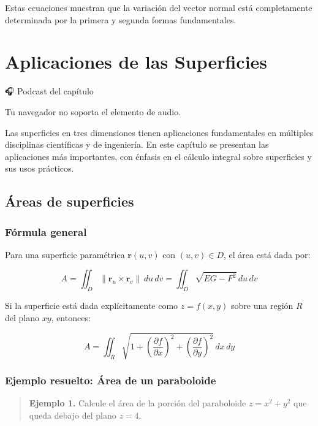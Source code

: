 \documentclass[
]{book}
\begin{document}
Estas ecuaciones muestran que la variación del vector normal está completamente determinada por la primera y segunda formas fundamentales.

\chapter{Aplicaciones de las Superficies}\label{aplicaciones}

🎧 Podcast del capítulo

Tu navegador no soporta el elemento de audio.

Las superficies en tres dimensiones tienen aplicaciones fundamentales en múltiples disciplinas científicas y de ingeniería. En este capítulo se presentan las aplicaciones más importantes, con énfasis en el cálculo integral sobre superficies y sus usos prácticos.

\section{Áreas de superficies}\label{uxe1reas-de-superficies}

\subsection{Fórmula general}\label{fuxf3rmula-general}

Para una superficie paramétrica \(\mathbf{r}(u, v)\) con \((u, v) \in D\), el área está dada por:

\[
A = \iint_D \|\mathbf{r}_u \times \mathbf{r}_v\| \, du\, dv = \iint_D \sqrt{EG - F^2} \, du\, dv
\]

Si la superficie está dada explícitamente como \(z = f(x, y)\) sobre una región \(R\) del plano \(xy\), entonces:

\[
A = \iint_R \sqrt{1 + \left(\frac{\partial f}{\partial x}\right)^2 + \left(\frac{\partial f}{\partial y}\right)^2} \, dx\, dy
\]

\subsection{Ejemplo resuelto: Área de un paraboloide}\label{ejemplo-resuelto-uxe1rea-de-un-paraboloide}

\begin{quote}
\textbf{Ejemplo 1.} Calcule el área de la porción del paraboloide \(z = x^2 + y^2\) que queda debajo del plano \(z = 4\).
\end{quote}
\end{document}
